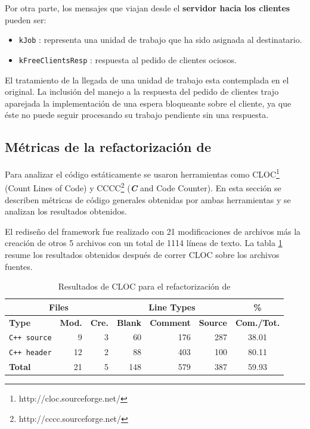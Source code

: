 Por otra parte, los mensajes que viajan desde el \textbf{servidor hacia los clientes} pueden ser:
\begin{itemize}
    \item   \texttt{kJob} : representa una unidad de trabajo que ha sido asignada al destinatario.
    \item   \texttt{kFreeClientsResp} : respuesta al pedido de clientes ociosos.
\end{itemize}

El tratamiento de la llegada de una unidad de trabajo esta contemplada en el \fud{} original. La inclusión del manejo a la respuesta del
pedido de clientes trajo aparejada la implementación de una espera bloqueante sobre el cliente, ya que éste no puede seguir procesando su
trabajo pendiente sin una respuesta.


\subsection{Métricas de la refactorización de \fud}

Para analizar el código estáticamente se usaron herramientas como CLOC\footnote{http://cloc.sourceforge.net/} (Count Lines of Code) y
CCCC\footnote{http://cccc.sourceforge.net/} (\textbf{\textit{C}} and \cpp{} Code Counter). En esta sección se describen métricas de
código generales obtenidas por ambas herramientas y se analizan los resultados obtenidos.

El rediseño del framework \fud{} fue realizado con 21 modificaciones de archivos más la creación de otros 5 archivos con un total de 1114
líneas de texto. La tabla \ref{cloc_redesign_fud} resume los resultados obtenidos después de correr CLOC sobre los archivos fuentes.

\begin{table}[!htf]
    \begin{center}
    \begin{tabular}{|l|r|r|r|r|r|c|}
    \hline
    \multicolumn{3}{|c|}{Files} & \multicolumn{3}{|c|}{Line Types} & \hspace{0.2cm}\% \\
    \hline
    \textbf{Type} & \textbf{Mod.} & \textbf{Cre.} & \textbf{Blank} & \textbf{Comment} & \textbf{Source} &
\small{\textbf{Com./Tot.}}\\
    \hline
    \texttt{C++ source} & 9   & 3   &    60  &    176   &   287 & 38.01 \\
    \hline
    \texttt{C++ header} & 12  & 2   &    88  &    403   &   100 & 80.11 \\
    \hline
    \textbf{Total}      & 21  & 5   &   148  &    579   &   387 & 59.93 \\
    \hline
    \end{tabular}
    \caption{Resultados de CLOC para el refactorización de \fud}
    \label{cloc_redesign_fud}
    \end{center}
\end{table}

